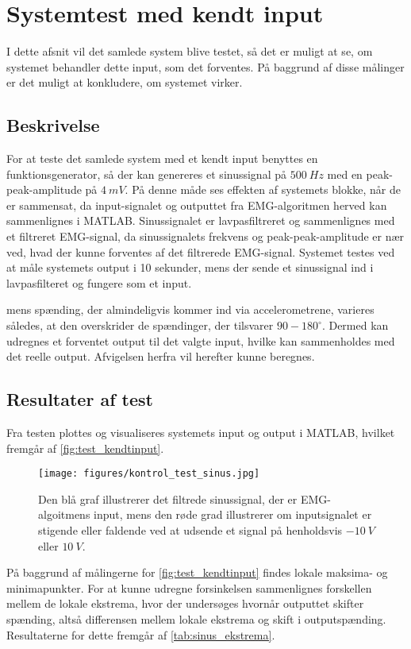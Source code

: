 \section{Systemtest med kendt input}
I dette afsnit vil det samlede system blive testet, så det er muligt at se, om systemet behandler dette input, som det forventes. På baggrund af disse målinger er det muligt at konkludere, om systemet virker. 

\subsection{Beskrivelse}
For at teste det samlede system med et kendt input benyttes en funktionsgenerator, så der kan genereres et sinussignal på $500~Hz$ med en peak-peak-amplitude på $4~mV$. På denne måde ses effekten af systemets blokke, når de er sammensat, da input-signalet og outputtet fra EMG-algoritmen herved kan sammenlignes i MATLAB. Sinussignalet er lavpasfiltreret og sammenlignes med et filtreret EMG-signal, da sinussignalets frekvens og peak-peak-amplitude er nær ved, hvad der kunne forventes af det filtrerede EMG-signal. Systemet testes ved at måle systemets output i 10 sekunder, mens der sende et sinussignal ind i lavpasfilteret og fungere som et input.
 
 
 
mens spænding, der almindeligvis kommer ind via accelerometrene, varieres således, at den overskrider de spændinger, der tilsvarer $90-180^{\circ}$. 
Dermed kan udregnes et forventet output til det valgte input, hvilke kan sammenholdes med det reelle output. Afvigelsen herfra vil herefter kunne beregnes. 
 
\subsection{Resultater af test}
Fra testen plottes og visualiseres systemets input og output i MATLAB, hvilket fremgår af \autoref{fig:test_kendtinput}. 

\begin{figure}[H]
\centering
\texttt{[image: figures/kontrol\_test\_sinus.jpg]}
\caption{Den blå graf illustrerer det filtrede sinussignal, der er EMG-algoitmens input, mens den røde grad illustrerer om inputsignalet er stigende eller faldende ved at udsende et signal på henholdsvis $-10~V$ eller $10~V$.}
\label{fig:test_kendtinput}
\end{figure}

På baggrund af målingerne for \autoref{fig:test_kendtinput} findes lokale maksima- og minimapunkter. For at kunne udregne forsinkelsen sammenlignes forskellen mellem de lokale ekstrema, hvor der undersøges hvornår outputtet skifter spænding, altså differensen mellem lokale ekstrema og skift i outputspænding. Resultaterne for dette fremgår af \autoref{tab:sinus_ekstrema}.


